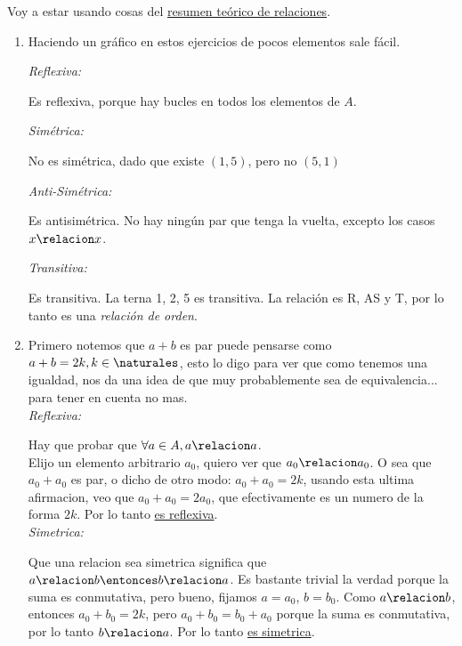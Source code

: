 Voy a estar usando cosas del \hyperlink{teoria-1:relaciones}{resumen teórico de relaciones}.

\begin{enumerate}[label=\roman*)]
  \item Haciendo un gráfico en estos ejercicios de pocos elementos sale fácil.\par

        \begin{minipage}{0.60\textwidth}
          \textit{Reflexiva:}\par
          Es reflexiva, porque hay bucles en todos los elementos de $A$.

          \textit{Simétrica:}\par
          No es simétrica, dado que existe $(1, 5)$, pero no $(5, 1)$

          \textit{Anti-Simétrica:}\par
          Es antisimétrica. No hay ningún par que tenga la vuelta, excepto los casos $x \relacion x$.

          \textit{Transitiva:}\par
          Es transitiva. La terna 1, 2, 5 es transitiva.
          La relación es R, AS y T, por lo tanto es una \textit{relación de orden}.
        \end{minipage}
        \begin{minipage}{0.3\textwidth}
          \quad  \veintidosi
        \end{minipage}

  \item Primero notemos que $a + b$ es par puede pensarse como $a + b = 2k, k \in \naturales$, esto lo digo
  para ver que como tenemos una igualdad, nos da una idea de que muy probablemente sea de equivalencia... para tener en cuenta no mas. \\
  \textit{Reflexiva:}\par 
  Hay que probar que $\forall a \in A, a \relacion a$. \\
  Elijo un elemento arbitrario $a_0$, quiero ver que $a_0 \relacion a_0$. O sea que $a_0 + a_0$ es par, o
  dicho de otro modo: $a_0 + a_0 = 2k$, usando esta ultima afirmacion, veo que $a_0 + a_0 = 2a_0$, que efectivamente
  es un numero de la forma $2k$. Por lo tanto \underline{es reflexiva}. \\
  
  \textit{Simetrica: }\par
  Que una relacion sea simetrica significa que $a \relacion b \entonces b \relacion a$. 
  Es bastante trivial la verdad porque la suma es conmutativa, pero bueno, fijamos $a = a_0$, $b = b_0$. 
  Como $a \relacion b$, entonces $a_0 + b_0 = 2k$, pero $a_0 + b_0 = b_0 + a_0$ porque la suma es conmutativa,
  por lo tanto $b \relacion a$. Por lo tanto \underline{es simetrica}. \\


\end{enumerate}
